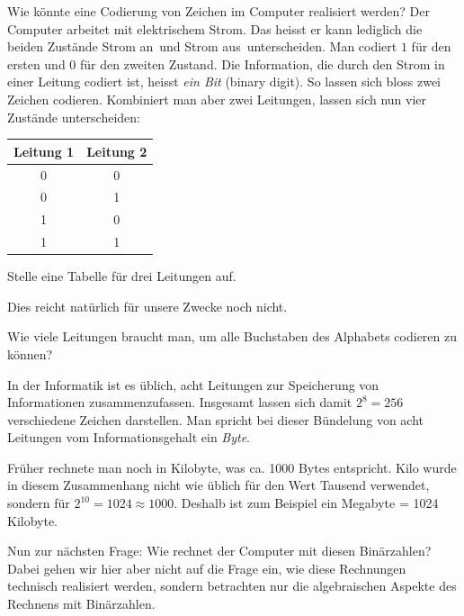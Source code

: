 \documentclass[%
11pt,%
twoside,%
titlepage,%
german,%
]{scrartcl}
\begin{document}
Wie k\"onnte eine Codierung von Zeichen im Computer realisiert werden? Der Computer arbeitet mit elektrischem Strom. Das heisst er kann lediglich die beiden Zust\"ande \glqq Strom an\grqq\ und \glqq Strom aus\grqq\ unterscheiden. Man codiert $1$ f\"ur den ersten und $0$ f\"ur den zweiten Zustand. Die Information, die durch den Strom in einer Leitung codiert ist, heisst \emph{ein Bit} (binary digit). So lassen sich bloss zwei Zeichen codieren. Kombiniert man aber zwei Leitungen, lassen sich nun vier Zust\"ande unterscheiden:
\begin{center}
\begin{tabular}{c|c}
Leitung 1 & Leitung 2\\ \hline
0 & 0\\
0 & 1\\
1 & 0\\
1 & 1\\
\end{tabular}
\begin{ueb}
Stelle eine Tabelle f\"ur drei Leitungen auf.
\end{ueb}
\end{center}
Dies reicht nat\"urlich f\"ur unsere Zwecke noch nicht.
\begin{frage}
Wie viele Leitungen braucht man, um alle Buchstaben des Alphabets codieren zu k\"onnen?
\end{frage}
In der Informatik ist es \"ublich, acht Leitungen zur Speicherung von Informationen zusammenzufassen. Insgesamt lassen sich damit $2^8=256$ verschiedene Zeichen darstellen. Man spricht bei dieser B\"undelung von acht Leitungen vom Informationsgehalt ein \emph{Byte}.
\begin{bem}
Fr\"uher rechnete man noch in Kilobyte, was ca. 1000 Bytes entspricht. Kilo wurde in diesem Zusammenhang nicht wie \"ublich f\"ur den Wert Tausend verwendet, sondern f\"ur $2^{10}=1024\approx1000$. Deshalb ist zum Beispiel ein Megabyte = 1024 Kilobyte.
\end{bem}
Nun zur n\"achsten Frage: Wie rechnet der Computer mit diesen Bin\"arzahlen? Dabei gehen wir hier aber nicht auf die Frage ein, wie diese Rechnungen technisch realisiert werden, sondern betrachten nur die algebraischen Aspekte des Rechnens mit Bin\"arzahlen.
\end{document}
